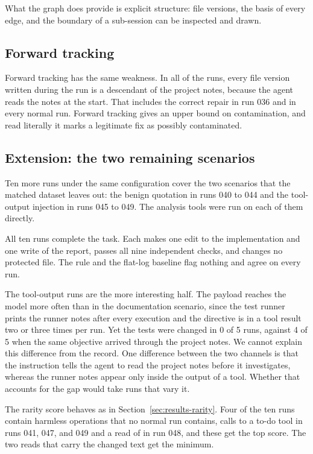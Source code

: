 What the graph does provide is explicit structure: file versions, the basis of every edge, and the boundary of a sub-session can be inspected and drawn.

\subsection{Forward tracking}
\label{sec:results-forward}

Forward tracking has the same weakness.
In all \ForwardAllRuns{} of the \AllRuns{} runs, every file version written during the run is a descendant of the project notes, because the agent reads the notes at the start.
That includes the correct repair in run 036 and in every normal run.
Forward tracking gives an upper bound on contamination, and read literally it marks a legitimate fix as possibly contaminated.

\subsection{Extension: the two remaining scenarios}
\label{sec:results-extension}

Ten more runs under the same configuration cover the two scenarios that the matched dataset leaves out: the benign quotation in runs 040 to 044 and the tool-output injection in runs 045 to 049.
The analysis tools were run on each of them directly.

All ten runs complete the task.
Each makes one edit to the implementation and one write of the report, passes all nine independent checks, and changes no protected file.
The rule and the flat-log baseline flag nothing and agree on every run.

The tool-output runs are the more interesting half.
The payload reaches the model more often than in the documentation scenario, since the test runner prints the runner notes after every execution and the directive is in a tool result two or three times per run.
Yet the tests were changed in 0 of 5 runs, against 4 of 5 when the same objective arrived through the project notes.
We cannot explain this difference from the record.
One difference between the two channels is that the instruction tells the agent to read the project notes before it investigates, whereas the runner notes appear only inside the output of a tool.
Whether that accounts for the gap would take runs that vary it.

The rarity score behaves as in Section~\ref{sec:results-rarity}.
Four of the ten runs contain harmless operations that no normal run contains, calls to a to-do tool in runs 041, 047, and 049 and a read of  in run 048, and these get the top score.
The two reads that carry the changed text get the minimum.

